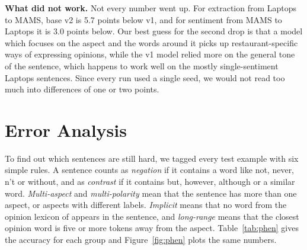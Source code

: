 \documentclass[11pt]{article}
\begin{document}
\textbf{What did not work.} Not every number went up. For extraction from Laptops to MAMS, base v2 is 5.7 points below v1, and for sentiment from MAMS to Laptops it is 3.0 points below. Our best guess for the second drop is that a model which focuses on the aspect and the words around it picks up restaurant-specific ways of expressing opinions, while the v1 model relied more on the general tone of the sentence, which happens to work well on the mostly single-sentiment Laptops sentences. Since every run used a single seed, we would not read too much into differences of one or two points.

\section{Error Analysis}
To find out which sentences are still hard, we tagged every test example with six simple rules. A sentence counts as \textit{negation} if it contains a word like not, never, n't or without, and as \textit{contrast} if it contains but, however, although or a similar word. \textit{Multi-aspect} and \textit{multi-polarity} mean that the sentence has more than one aspect, or aspects with different labels. \textit{Implicit} means that no word from the opinion lexicon of \citet{hu2004mining} appears in the sentence, and \textit{long-range} means that the closest opinion word is five or more tokens away from the aspect. Table~\ref{tab:phen} gives the accuracy for each group and Figure~\ref{fig:phen} plots the same numbers.
\end{document}
